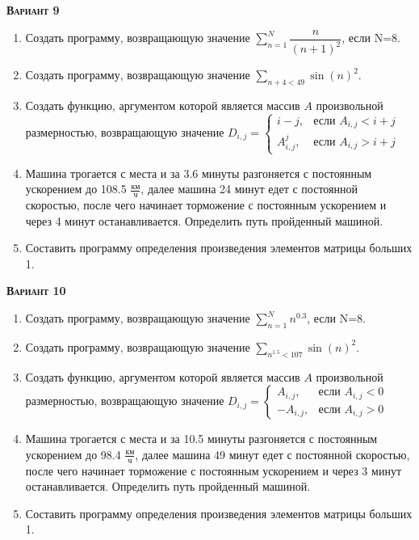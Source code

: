 \textsc{\textbf{Вариант 9}}
\begin{enumerate}
\item  Создать программу, возвращающую значение $\sum\limits_{n=1}^{N} \dfrac{n}{(n+1)^2}            $, если N=8. 
\item  Создать программу, возвращающую значение $\sum\limits_{n+4<      49} {\sin(n)}^2                   $. 
\item Создать функцию, аргументом которой является массив $A$ произвольной размерностью, возвращающую значение $D_{i,j}=\begin{cases} i-j, & \text{если } {A_{i,j}}<i+j \\  A_{i,j}^j, & \text{если } {A_{i,j}}>i+j \end{cases}                              $ 
\item Машина трогается с места и за  3.6 минуты разгоняется с постоянным ускорением до 108.5 ${\frac{км}{ч}}$, далее машина   24 минут едет с постоянной скоростью, после чего начинает торможение с постоянным ускорением и через   4 минут останавливается. Определить путь пройденный машиной.  \item Составить программу определения произведения элементов матрицы больших 1.                                                                                                                                                                                                              

\end{enumerate}
\textsc{\textbf{Вариант 10}}
\begin{enumerate}
\item  Создать программу, возвращающую значение $\sum\limits_{n=1}^{N} {n}^{0.3}                     $, если N=8. 
\item  Создать программу, возвращающую значение $\sum\limits_{n^{1.5}< 107} {\sin(n)}^2                   $. 
\item Создать функцию, аргументом которой является массив $A$ произвольной размерностью, возвращающую значение $D_{i,j}=\begin{cases} A_{i,j}, & \text{если } A_{i,j}<0 \\ -A_{i,j}, & \text{если } A_{i,j}>0 \end{cases}                                    $ 
\item Машина трогается с места и за 10.5 минуты разгоняется с постоянным ускорением до 98.4 ${\frac{км}{ч}}$, далее машина   49 минут едет с постоянной скоростью, после чего начинает торможение с постоянным ускорением и через   3 минут останавливается. Определить путь пройденный машиной.  \item Составить программу определения произведения элементов матрицы больших 1.                                                                                                                                                                                                              

\end{enumerate}
